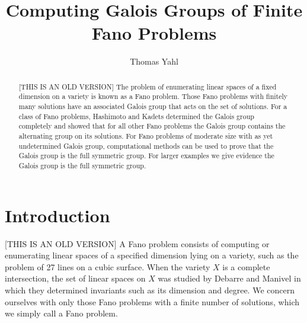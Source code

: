\documentclass[12pt]{amsart}
\title{Computing Galois Groups of Finite Fano Problems}
\author[T.~Yahl]{Thomas Yahl}
\theoremstyle{definition}
\begin{document}
%
%
%
%
%
%



\begin{abstract}
[THIS IS AN OLD VERSION]
The problem of enumerating linear spaces of a fixed dimension on a variety is known as a Fano problem. Those Fano problems with finitely many solutions have an associated Galois group that acts on the set of solutions. For a class of Fano problems, Hashimoto and Kadets determined the Galois group completely and showed that for all other Fano problems the Galois group contains the alternating group on its solutions. For Fano problems of moderate size with as yet undetermined Galois group, computational methods can be used to prove that the Galois group is the full symmetric group. For larger examples we give evidence the Galois group is the full symmetric group.
\end{abstract}

\maketitle

\section{Introduction}
%
[THIS IS AN OLD VERSION] A Fano problem consists of computing or enumerating linear spaces of a specified dimension lying on a variety, such as the problem of 27 lines on a cubic surface. When the variety $X$ is a complete intersection, the set of linear spaces on $X$ was studied by Debarre and Manivel \cite{DM} in which they determined invariants such as its dimension and degree. We concern ourselves with only those Fano problems with a finite number of solutions, which we simply call a Fano problem. 
\end{document}
